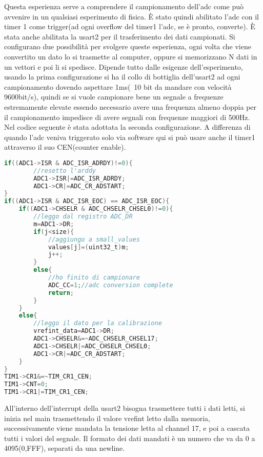 \documentclass[main.tex]{subfiles}
\begin{document}
Questa esperienza serve a comprendere il campionamento dell'adc come può avvenire in un qualsiasi esperimento di fisica. È stato quindi abilitato l'adc con il timer 1 come trigger(ad ogni overflow del timer1 l'adc, se è pronto, converte). È stata anche abilitata la usart2 per il trasferimento dei dati campionati. 
Si configurano due possibilità per svolgere queste esperienza, ogni volta che viene convertito un dato lo si trasmette al computer, oppure si memorizzano N dati in un vettori e poi li si spedisce. 
Dipende tutto dalle esigenze dell'esperimento, usando la prima configurazione si ha il collo di bottiglia dell'usart2 ad ogni campionamento dovendo aspettare 1ms(~10 bit da mandare con velocità 9600bit/s), quindi se si vuole campionare bene un segnale a frequenze estremamente elevate essendo necessario avere una frequenza almeno doppia per il campionamento impedisce di avere segnali con frequenze maggiori di 500Hz. Nel codice seguente è stata adottata la seconda configurazione. 
A differenza di quando l'adc veniva triggerato solo via software qui si può usare anche il timer1 attraverso il suo CEN(counter enable). 
\begin{lstlisting}[caption=Interrupt ADC, language=C]
if((ADC1->ISR & ADC_ISR_ADRDY)!=0){
        //resetto l'arddy
        ADC1->ISR|=ADC_ISR_ADRDY;
        ADC1->CR|=ADC_CR_ADSTART;
}
if((ADC1->ISR & ADC_ISR_EOC) == ADC_ISR_EOC){
    if((ADC1->CHSELR & ADC_CHSELR_CHSEL0)!=0){
	    //leggo dal registro ADC_DR
        m=ADC1->DR;
        if(j<size){
            //aggiungo a small_values
            values[j]=(uint32_t)m;
            j++;
        }
        else{
            //ho finito di campionare
            ADC_CC=1;//adc conversion complete
            return;
        }
    }
    else{
        //leggo il dato per la calibrazione
        vrefint_data=ADC1->DR;
        ADC1->CHSELR&=~ADC_CHSELR_CHSEL17;
        ADC1->CHSELR|=ADC_CHSELR_CHSEL0;
        ADC1->CR|=ADC_CR_ADSTART;
    }
}
TIM1->CR1&=~TIM_CR1_CEN;
TIM1->CNT=0;
TIM1->CR1|=TIM_CR1_CEN;
\end{lstlisting}
All'interno dell'interrupt della usart2 bisogna trasmettere tutti i dati letti, si inizia nel main trasmettendo il valore vrefint letto dalla memoria, successivamente viene mandata la tensione letta al channel 17, e poi a cascata tutti i valori del segnale. Il formato dei dati mandati è un numero che va da 0 a 4095(0,FFF), separati da una newline. 
\end{document}
